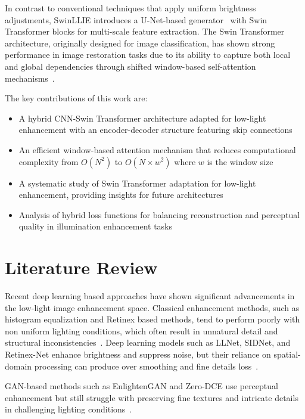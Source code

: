 \documentclass[conference]{IEEEtran}
\begin{document}
In contrast to conventional techniques that apply uniform brightness adjustments, SwinLLIE introduces a U-Net-based generator~\cite{ronneberger2015unet} with Swin Transformer blocks for multi-scale feature extraction. The Swin Transformer architecture, originally designed for image classification, has shown strong performance in image restoration tasks due to its ability to capture both local and global dependencies through shifted window-based self-attention mechanisms~\cite{liu2021swin, liang2021swinir}.

The key contributions of this work are:
\begin{itemize}
    \item A hybrid CNN-Swin Transformer architecture adapted for low-light enhancement with an encoder-decoder structure featuring skip connections
    \item An efficient window-based attention mechanism that reduces computational complexity from $O(N^2)$ to $O(N \times w^2)$ where $w$ is the window size
    \item A systematic study of Swin Transformer adaptation for low-light enhancement, providing insights for future architectures
    \item Analysis of hybrid loss functions for balancing reconstruction and perceptual quality in illumination enhancement tasks
\end{itemize}

\section{Literature Review}

Recent deep learning based approaches have shown significant advancements in the low-light image enhancement space. Classical enhancement methods, such as histogram equalization and Retinex based methods, tend to perform poorly with non uniform lighting conditions, which often result in unnatural detail and structural inconsistencies~\cite{land1977retinex}. Deep learning models such as LLNet, SIDNet, and Retinex-Net enhance brightness and suppress noise, but their reliance on spatial-domain processing can produce over smoothing and fine details loss~\cite{lore2017llnet}.

GAN-based methods such as EnlightenGAN and Zero-DCE use perceptual enhancement but still struggle with preserving fine textures and intricate details in challenging lighting conditions~\cite{jiang2021enlightengan, guo2020zero}.
\end{document}
